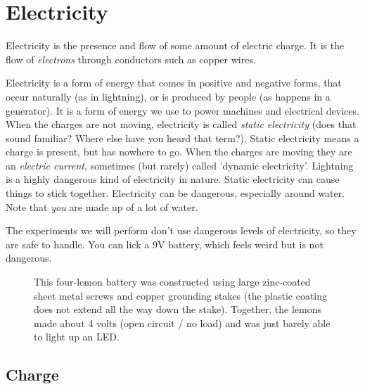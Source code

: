 \section{Electricity}

Electricity is the presence and flow of some amount of electric charge. It is the flow of \emph{electrons} through conductors such as copper wires.

Electricity is a form of energy that comes in positive and negative forms, that occur naturally (as in lightning), or is produced by people (as happens in a generator). It is a form of energy we use to power machines and electrical devices. When the charges are not moving, electricity is called \emph{static electricity} (does that sound familiar? Where else have you heard that term?). Static electricity means a charge is present, but has nowhere to go.
When the charges are moving they are an \emph{electric current}, sometimes (but rarely) called 'dynamic electricity'. Lightning is a highly dangerous kind of electricity in nature. Static electricity can cause things to stick together. Electricity can be dangerous, especially around water. Note that \emph{you} are made up of a lot of water.

The experiments we will perform don't use dangerous levels of electricity, so they are safe to handle. You can lick a 9V battery, which feels weird but is not dangerous.

\bigskip


\begin{figure}
\begin{center}
\medskip
\caption{This four-lemon battery was constructed using large zinc-coated sheet metal screws and copper grounding stakes (the plastic coating does not extend all the way down the stake). Together, the lemons made about 4 volts (open circuit / no load) and was just barely able to light up an LED.}
\end{center}
\end{figure}


\subsection*{Charge}

